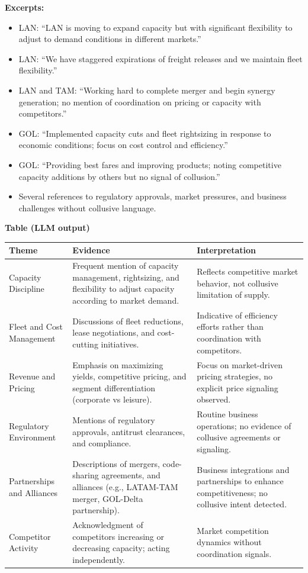 \documentclass[12pt]{article}
\begin{document}
\textbf{Excerpts:}
\begin{itemize}
\item LAN: ``LAN is moving to expand capacity but with significant flexibility to adjust to demand conditions in different markets.''
\item LAN: ``We have staggered expirations of freight releases and we maintain fleet flexibility.''
\item LAN and TAM: ``Working hard to complete merger and begin synergy generation; no mention of coordination on pricing or capacity with competitors.''
\item GOL: ``Implemented capacity cuts and fleet rightsizing in response to economic conditions; focus on cost control and efficiency.''
\item GOL: ``Providing best fares and improving products; noting competitive capacity additions by others but no signal of collusion.''
\item Several references to regulatory approvals, market pressures, and business challenges without collusive language.
\end{itemize}

\textbf{Table (LLM output)}
\begin{table}[ht]
\centering
\footnotesize
\begin{tabular}{p{}p{}p{}}
\toprule
Theme & Evidence & Interpretation \\
\midrule
Capacity Discipline & Frequent mention of capacity management, rightsizing, and flexibility to adjust capacity according to market demand. & Reflects competitive market behavior, not collusive limitation of supply. \\
Fleet and Cost Management & Discussions of fleet reductions, lease negotiations, and cost-cutting initiatives. & Indicative of efficiency efforts rather than coordination with competitors. \\
Revenue and Pricing & Emphasis on maximizing yields, competitive pricing, and segment differentiation (corporate vs leisure). & Focus on market-driven pricing strategies, no explicit price signaling observed. \\
Regulatory Environment & Mentions of regulatory approvals, antitrust clearances, and compliance. & Routine business operations; no evidence of collusive agreements or signaling. \\
Partnerships and Alliances & Descriptions of mergers, code-sharing agreements, and alliances (e.g., LATAM-TAM merger, GOL-Delta partnership). & Business integrations and partnerships to enhance competitiveness; no collusive intent detected. \\
Competitor Activity & Acknowledgment of competitors increasing or decreasing capacity; acting independently. & Market competition dynamics without coordination signals. \\
\bottomrule
\end{tabular}
\end{table}
\end{document}
